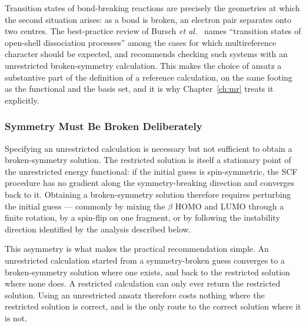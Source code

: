 
\medskip
Transition states of bond-breaking reactions are precisely the geometries at
which the second situation arises: as a bond is broken, an electron pair
separates onto two centres. The best-practice review of Bursch \emph{et
al.}~\cite{bursch2022} names ``transition states of open-shell dissociation
processes'' among the cases for which multireference character should be
expected, and recommends checking such systems with an unrestricted
broken-symmetry calculation. This makes the choice of ansatz a substantive part
of the definition of a reference calculation, on the same footing as the
functional and the basis set, and it is why Chapter~\ref{ch:mr} treats it
explicitly.

\subsubsection{Symmetry Must Be Broken Deliberately}

Specifying an unrestricted calculation is necessary but not sufficient to obtain
a broken-symmetry solution. The restricted solution is itself a stationary point
of the unrestricted energy functional: if the initial guess is spin-symmetric,
the SCF procedure has no gradient along the symmetry-breaking direction and
converges back to it. Obtaining a broken-symmetry solution therefore requires
perturbing the initial guess --- commonly by mixing the $\beta$ HOMO and LUMO
through a finite rotation, by a spin-flip on one fragment, or by following the
instability direction identified by the analysis described below.

This asymmetry is what makes the practical recommendation simple. An unrestricted
calculation started from a symmetry-broken guess converges to a broken-symmetry
solution where one exists, and back to the restricted solution where none does.
A restricted calculation can only ever return the restricted solution. Using an
unrestricted ansatz therefore costs nothing where the restricted solution is
correct, and is the only route to the correct solution where it is not.

